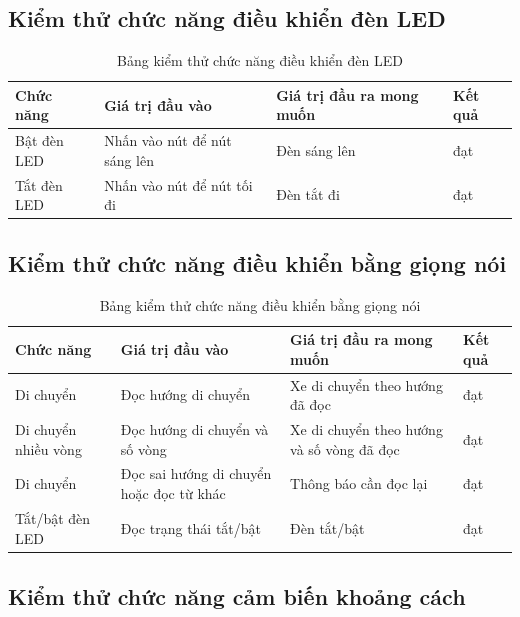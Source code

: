 \documentclass[../DoAn.tex]{subfiles}
\begin{document}
\subsection{Kiểm thử chức năng điều khiển đèn LED}

\begin{table}[H]
\begin{tabular}{| p{3cm} | p{4cm} | p{5cm} | p{2cm} |}
\hline
\rowcolor[HTML]{FFCE93} 
\textbf{Chức năng} & \textbf{Giá trị đầu vào}       & \textbf{Giá trị đầu ra mong muốn}                            & Kết quả \\ \hline
Bật đèn LED          & Nhấn vào nút để nút sáng lên  & Đèn sáng lên                               & đạt     \\ \hline
Tắt đèn LED          & Nhấn vào nút để nút tối đi & Đèn tắt đi           & đạt     \\ \hline
\end{tabular}
\caption{Bảng kiểm thử chức năng điều khiển đèn LED}
\end{table}

\subsection{Kiểm thử chức năng điều khiển bằng giọng nói}

\begin{table}[H]
\begin{tabular}{| p{3cm} | p{4cm} | p{5cm} | p{2cm} |}
\hline
\rowcolor[HTML]{FFCE93} 
\textbf{Chức năng} & \textbf{Giá trị đầu vào}       & \textbf{Giá trị đầu ra mong muốn}                            & Kết quả \\ \hline
Di chuyển          & Đọc hướng di chuyển & Xe di chuyển theo hướng đã đọc                               & đạt     \\ \hline
Di chuyển nhiều vòng          & Đọc hướng di chuyển và số vòng & Xe di chuyển theo hướng và số vòng đã đọc          & đạt     \\ \hline
Di chuyển          & Đọc sai hướng di chuyển hoặc đọc từ khác             & Thông báo cần đọc lại & đạt     \\ \hline
Tắt/bật đèn LED & Đọc trạng thái tắt/bật             & Đèn tắt/bật & đạt    \\ \hline
\end{tabular}
\caption{Bảng kiểm thử chức năng điều khiển bằng giọng nói}
\end{table}

\subsection{Kiểm thử chức năng cảm biến khoảng cách}
\end{document}
